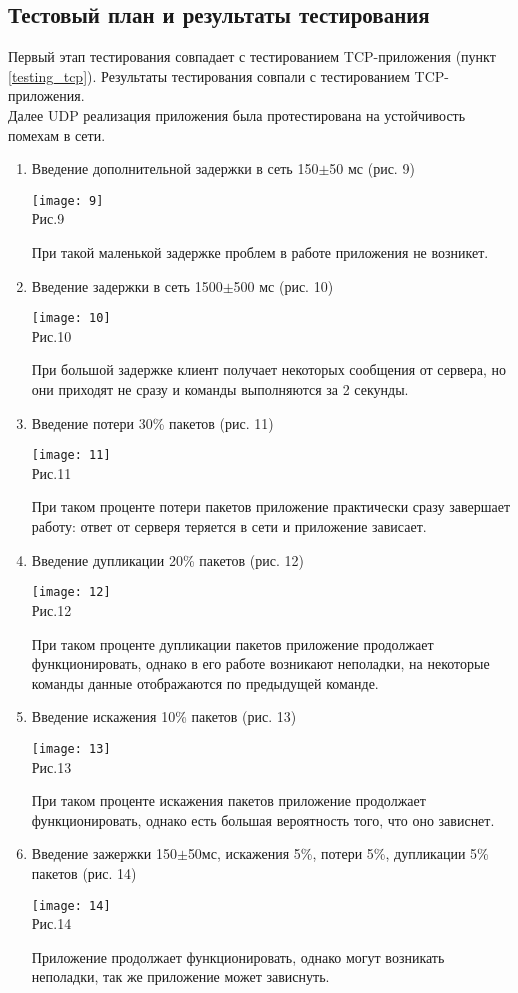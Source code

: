 \documentclass[12pt,a4paper]{report}
\begin{document}
\subsection{Тестовый план и результаты тестирования}
Первый этап тестирования совпадает с тестированием TCP-приложения (пункт \ref{testing_tcp}). Результаты тестирования совпали с тестированием TCP-приложения.\\
Далее UDP реализация приложения была протестирована на устойчивость помехам в сети.
\begin{enumerate}
	\item Введение дополнительной задержки в сеть 150$\pm$50 мс (рис. 9)
			\begin{center}
\texttt{[image: 9]}\\
Рис.9\\
\end{center}
		При такой маленькой задержке проблем в работе приложения не возникет.
	\item Введение задержки в сеть 1500$\pm$500 мс (рис. 10)
\begin{center}
\texttt{[image: 10]}\\
Рис.10\\
\end{center}
		При большой задержке клиент получает некоторых сообщения от сервера, но они приходят не сразу и команды выполняются за 2 секунды.
		\item Введение потери 30\% пакетов (рис. 11)
\begin{center}
\texttt{[image: 11]}\\
Рис.11\\
\end{center}
		При таком проценте потери пакетов приложение практически сразу завершает работу: ответ от серверя теряется в сети и приложение зависает.
		\item Введение дупликации 20\% пакетов (рис. 12)
\begin{center}
\texttt{[image: 12]}\\
Рис.12\\
\end{center}
		При таком проценте дупликации пакетов приложение продолжает функционировать, однако в его работе возникают неполадки, на некоторые команды данные отображаются по предыдущей команде.
	\item Введение искажения 10\% пакетов (рис. 13)
\begin{center}
\texttt{[image: 13]}\\
Рис.13\\
\end{center}
		При таком проценте искажения пакетов приложение продолжает функционировать, однако есть большая вероятность того, что оно зависнет.
	\item Введение зажержки 150$\pm$50мс, искажения 5\%, потери 5\%, дупликации 5\% пакетов (рис. 14)
\begin{center}
\texttt{[image: 14]}\\
Рис.14\\
\end{center}
		Приложение продолжает функционировать, однако могут возникать неполадки, так же приложение может зависнуть.
	\end{enumerate}
\end{document}
